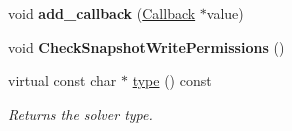 \begin{DoxyCompactItemize}
void {\bfseries add\+\_\+callback} (\mbox{\hyperlink{classcaffe_1_1_solver_1_1_callback}{Callback}} $\ast$value)
\item 
\mbox{\label{classcaffe_1_1_solver_a657d215c62782e1a0767847e51eaedd5}} 
void {\bfseries Check\+Snapshot\+Write\+Permissions} ()
\item 
\mbox{\label{classcaffe_1_1_solver_a733bef9a2e7dea29f52ed46a922d96f7}} 
virtual const char $\ast$ \mbox{\hyperlink{classcaffe_1_1_solver_a733bef9a2e7dea29f52ed46a922d96f7}{type}} () const
\begin{DoxyCompactList}\small\item\em Returns the solver type. \end{DoxyCompactList}\end{DoxyCompactItemize}
